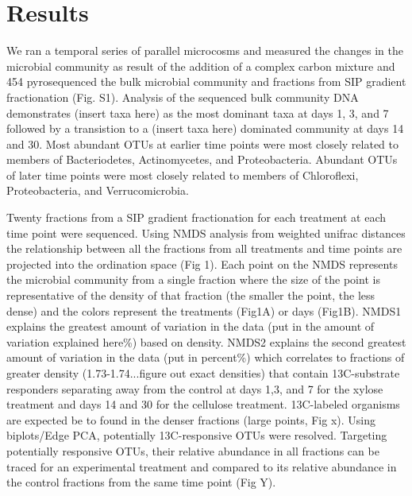 \section{Results}
We ran a temporal series of parallel microcosms and measured the changes in the microbial community as result of the addition of a complex carbon mixture and 454 pyrosequenced the bulk microbial community and fractions from SIP gradient fractionation (Fig. S1). Analysis of the sequenced bulk community DNA demonstrates (insert taxa here) as the most dominant taxa at days 1, 3, and 7 followed by a transistion to a (insert taxa here) dominated community at days 14 and 30. Most abundant OTUs at earlier time points were most closely related to members of Bacteriodetes, Actinomycetes, and Proteobacteria. Abundant OTUs of later time points were most closely related to members of Chloroflexi, Proteobacteria, and Verrucomicrobia. 

Twenty fractions from a SIP gradient fractionation for each treatment at each time point were sequenced. Using NMDS analysis from weighted unifrac distances the relationship between all the fractions from all treatments and time points are projected into the ordination space (Fig 1). Each point on the NMDS represents the microbial community from a single fraction where the size of the point is representative of the density of that fraction (the smaller the point, the less dense) and the colors represent the treatments (Fig1A) or days (Fig1B). NMDS1 explains the greatest amount of variation in the data (put in the amount of variation explained here\%) based on density. NMDS2 explains the second greatest amount of variation in the data (put in percent\%) which correlates to fractions of greater density (1.73-1.74...figure out exact densities) that contain 13C-substrate responders separating away from the control at days 1,3, and 7 for the xylose treatment and days 14 and 30 for the cellulose treatment. 13C-labeled organisms are expected be to found in the denser fractions (large points, Fig x). Using biplots/Edge PCA, potentially 13C-responsive OTUs were resolved.  Targeting potentially responsive OTUs, their relative abundance in all fractions can be traced for an experimental treatment and compared to its relative abundance in the control fractions from the same time point (Fig Y).       
          

 